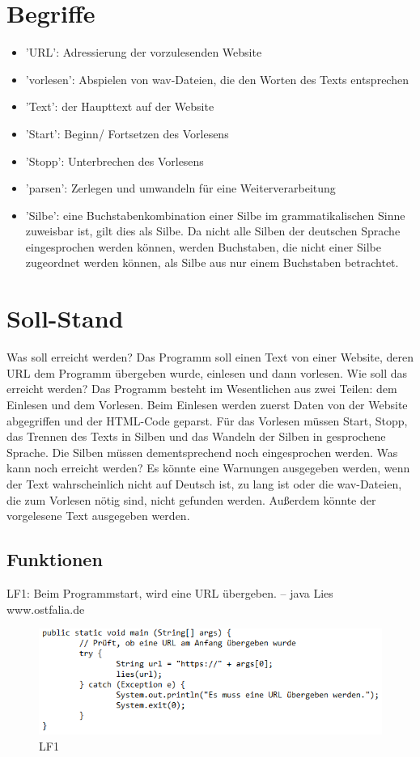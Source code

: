 \documentclass[12pt]{scrartcl}
\begin{document}
\section{Begriffe}
\begin{itemize}
    \item 'URL': Adressierung der vorzulesenden Website
    \item 'vorlesen': Abspielen von wav-Dateien, die den Worten des Texts entsprechen
    \item 'Text': der Haupttext auf der Website
    \item 'Start': Beginn/ Fortsetzen des Vorlesens
    \item 'Stopp': Unterbrechen des Vorlesens
    \item 'parsen': Zerlegen und umwandeln für eine Weiterverarbeitung
    \item 'Silbe': eine Buchstabenkombination einer Silbe im grammatikalischen Sinne zuweisbar ist, gilt dies als Silbe. Da nicht alle Silben der deutschen Sprache eingesprochen werden können, werden Buchstaben, die nicht                 einer Silbe zugeordnet werden können, als Silbe aus nur einem Buchstaben betrachtet.
\end{itemize}

\section{Soll-Stand}
Was soll erreicht werden?
Das Programm soll einen Text von einer Website, deren URL dem Programm übergeben wurde, einlesen und dann vorlesen.
Wie soll das erreicht werden?
Das Programm besteht im Wesentlichen aus zwei Teilen: dem Einlesen und dem Vorlesen. Beim Einlesen werden zuerst Daten von der Website abgegriffen und der HTML-Code geparst. Für das Vorlesen müssen Start, Stopp, das Trennen des Texts in Silben und das Wandeln der Silben in gesprochene Sprache. Die Silben müssen dementsprechend noch eingesprochen werden.
Was kann noch erreicht werden?
Es könnte eine Warnungen ausgegeben werden, wenn der Text wahrscheinlich nicht auf Deutsch ist, zu lang ist oder die wav-Dateien, die zum Vorlesen nötig sind, nicht gefunden werden. Außerdem könnte der vorgelesene Text ausgegeben werden.


\subsection{Funktionen}

LF1: Beim Programmstart, wird eine URL übergeben.\newline
-- java Lies www.ostfalia.de
\begin{figure}[hp!]
 \centering
 \includegraphics[width=1.0\textwidth]{res/LF1}
 \caption{LF1}
 \label{fig: fig1}
\end{figure}
~
\end{document}
